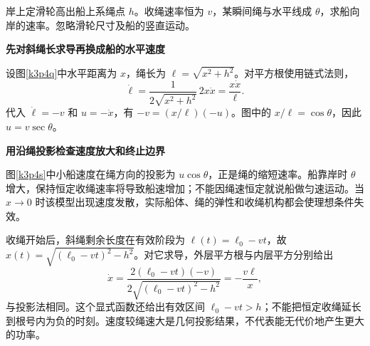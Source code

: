 \begin{question}\begin{example}[斜绳牵引小船]\label{k3p4}
岸上定滑轮高出船上系绳点 $h$。收绳速率恒为 $v$，某瞬间绳与水平线成 $\theta$，求船向岸的速率。忽略滑轮尺寸及船的竖直运动。\end{example}
\end{question}
\begin{solution}\textbf{先对斜绳长求导再换成船的水平速度}\par\nobreak
设图\ref{k3p4q}中水平距离为 $x$，绳长为 $\ell=\sqrt{x^2+h^2}$。对平方根使用链式法则，
\[\dot\ell=\frac{1}{2\sqrt{x^2+h^2}}\,2x\dot x=\frac{x\dot x}{\ell}.\]
代入 $\dot\ell=-v$ 和 $u=-\dot x$，有 $-v=(x/\ell)(-u)$。图中的 $x/\ell=\cos\theta$，因此 $\boxed{u=v\sec\theta}$。


\par\medskip{}\noindent\textbf{用沿绳投影检查速度放大和终止边界}\par\nobreak
图\ref{k3p4s}中小船速度在绳方向的投影为 $u\cos\theta$，正是绳的缩短速率。船靠岸时 $\theta$ 增大，保持恒定收绳速率将导致船速增加；不能因绳速恒定就说船做匀速运动。当 $x\to0$ 时该模型出现速度发散，实际船体、绳的弹性和收绳机构都会使理想条件失效。

收绳开始后，斜绳剩余长度在有效阶段为 $\ell(t)=\ell_0-vt$，故 $x(t)=\sqrt{(\ell_0-vt)^2-h^2}$。对它求导，外层平方根与内层平方分别给出
\[\dot x=\frac{2(\ell_0-vt)(-v)}{2\sqrt{(\ell_0-vt)^2-h^2}}
 =-\frac{v\ell}{x},\]
与投影法相同。这个显式函数还给出有效区间 $\ell_0-vt>h$；不能把恒定收绳延长到根号内为负的时刻。速度较绳速大是几何投影结果，不代表能无代价地产生更大的功率。\end{solution}


